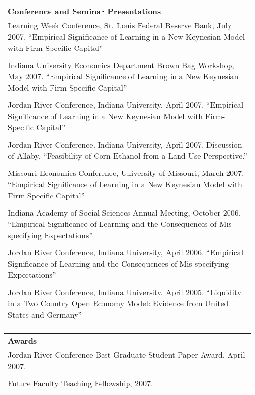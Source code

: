 \begin{tabular}{p{5.5in}}
\textbf{Conference and Seminar Presentations} \\
Learning Week Conference, St. Louis Federal Reserve Bank, July 2007.\newline
\indent ``Empirical Significance of Learning in a New Keynesian Model with Firm-Specific Capital'' \\\\
Indiana University Economics Department Brown Bag Workshop, May 2007.\newline
\indent ``Empirical Significance of Learning in a New Keynesian Model with Firm-Specific Capital''\\\\
Jordan River Conference, Indiana University, April 2007.\newline
\indent ``Empirical Significance of Learning in a New Keynesian Model with Firm-Specific Capital''\\\\
Jordan River Conference, Indiana University, April 2007.\newline
\indent Discussion of Allaby, ``Feasibility of Corn Ethanol from a Land Use Perspective.''\\\\
Missouri Economics Conference, University of Missouri, March 2007.\newline
\indent ``Empirical Significance of Learning in a New Keynesian Model with Firm-Specific Capital''\\\\
Indiana Academy of Social Sciences Annual Meeting, October 2006.\newline
\indent ``Empirical Significance of Learning and the Consequences of Mis-specifying Expectations''\\\\
Jordan River Conference, Indiana University, April 2006.\newline
\indent ``Empirical Significance of Learning and the Consequences of Mis-specifying Expectations''\\\\
Jordan River Conference, Indiana University, April 2005.\newline
\indent ``Liquidity in a Two Country Open Economy Model: Evidence from United States and Germany''\\\\
\end{tabular} 

\begin{tabular}{p{5.5in}}
\textbf{Awards} \\
Jordan River Conference Best Graduate Student Paper Award, April 2007. \\\\
Future Faculty Teaching Fellowship, 2007. \\
\end{tabular} \\ \\


